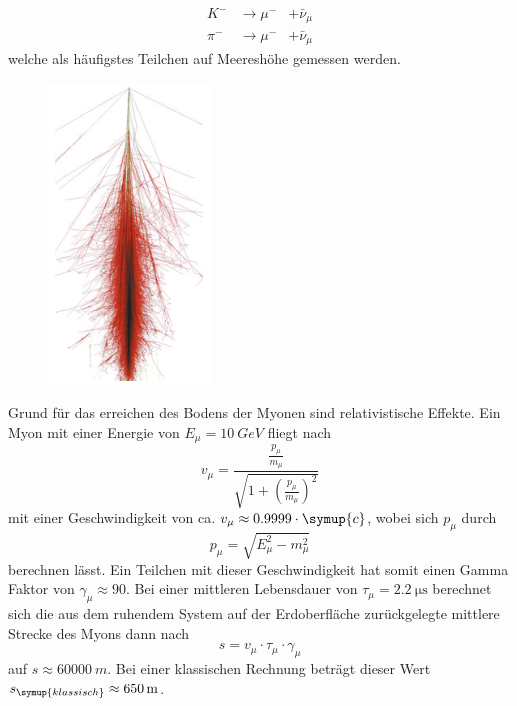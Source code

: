 \begin{equation}
    \begin{aligned}
        K^- &\rightarrow \mu^- &+ \bar{\nu}_\mu \\
        \pi^- &\rightarrow \mu^- &+ \bar{\nu}_\mu
    \end{aligned}
\end{equation}
welche als häufigstes Teilchen auf Meereshöhe gemessen werden.
\begin{figure}[H]
 \centering
 \includegraphics[width=0.2\linewidth]{data/Luftschauer.png}
 \label{fig:luftschauer}
\end{figure}
\noindent
Grund für das erreichen des Bodens der Myonen sind relativistische Effekte. Ein Myon mit einer Energie von $E_{\mu} = \SI{10}{GeV}$ fliegt nach 
\begin{equation}
    \label{eqn:t1}
    v_\mu = \frac{\frac{p_\mu}{m_\mu}}{\sqrt{1 + \left( \frac{p_\mu}{m_\mu} \right)^{2}}}
\end{equation}
mit einer Geschwindigkeit von ca. $v_{\mu} \approx 0.9999 \cdot \symup{c}$, wobei sich $p_\mu$ durch 
\begin{equation}
    p_\mu = \sqrt{E_\mu^2 - m_\mu^2}
\end{equation}
berechnen lässt.
Ein Teilchen mit dieser Geschwindigkeit hat somit einen Gamma Faktor von $\gamma_\mu \approx 90$. Bei einer mittleren Lebensdauer von $\tau_{\mu} = \SI{2.2}{\micro\second}$ \cite{pdg} berechnet sich die aus dem ruhendem System auf der Erdoberfläche zurückgelegte mittlere Strecke des Myons dann nach 
\begin{equation}
    \label{eqn:t2}
    s = v_{\mu} \cdot \tau_{\mu} \cdot \gamma_{\mu}
\end{equation}
auf $s \approx \SI{60000}{m}$. Bei einer klassischen Rechnung beträgt dieser Wert $s_{\symup{klassisch}} \approx \SI{650}{m}$.
